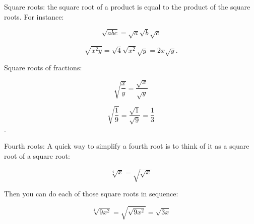 \documentclass[11pt]{article}
\begin{document}
Square roots: the square root of a product is equal to the product of the square roots. For instance:

$$\sqrt{abc} = \sqrt{a}\sqrt{b} \sqrt{c}$$

$$\sqrt{x^2y} = \sqrt{4}\sqrt{x^2}\sqrt{y} = 2x\sqrt{y}.$$

Square roots of fractions:

$$\sqrt{\frac{x}{y}} = \frac {\sqrt{x}}{\sqrt{y}}$$

$$\sqrt{\frac{1}{9}} = \frac{\sqrt{1}}{\sqrt{9}} = \frac{1}{3}$$.

Fourth roots: A quick way to simplify a fourth root is to think of it as a square root of a square root:

$$\sqrt[4]{x} = \sqrt{\sqrt{x}}$$

Then you can do each of those square roots in sequence:

$$\sqrt[4]{9x^2} = \sqrt{\sqrt{9x^2}} = \sqrt{3 x}$$
\end{document}
